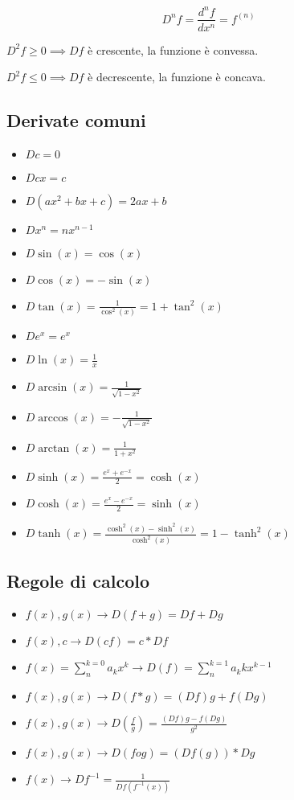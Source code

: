 \documentclass{article}
\begin{document}
$$
D^nf = \frac{d^nf}{dx^n} = f^{(n)}
$$

\begin{description}
    \item $D^2f \geq 0 \implies Df$ è crescente, la funzione è convessa.
    \item $D^2f \leq 0 \implies Df$ è decrescente, la funzione è concava.
\end{description}

\subsection{Derivate comuni}

\begin{itemize}
    \item $Dc = 0$
    \item $Dcx = c$
    \item $D(ax^2 + bx + c) = 2ax + b$
    \item $Dx^n = nx^{n - 1}$
    \item $D\sin(x) = \cos(x)$
    \item $D\cos(x) = -\sin(x)$
    \item $D\tan(x) = \frac{1}{\cos^2(x)} = 1 + \tan^2(x)$
    \item $De^x = e^x$
    \item $D\ln(x) = \frac{1}{x}$
    \item $D\arcsin(x) = \frac{1}{\sqrt{1 - x^2}}$
    \item $D\arccos(x) = -\frac{1}{\sqrt{1 - x^2}}$
    \item $D\arctan(x) = \frac{1}{1 + x^2}$
    \item $D\sinh(x) = \frac{e^x + e^{-x}}{2} = \cosh(x)$
    \item $D\cosh(x) = \frac{e^x - e^{-x}}{2} = \sinh(x)$
    \item $D\tanh(x) = \frac{\cosh^2(x) - \sinh^2(x)}{\cosh^2(x)} = 1 - \tanh^2(x)$
\end{itemize}

\subsection{Regole di calcolo}

\begin{itemize}
    \item $f(x), g(x) \rightarrow D(f + g) = Df + Dg$
    \item $f(x), c \rightarrow D(cf) = c * Df$
    \item $f(x) = \sum_{n}^{k = 0} a_k x^k \rightarrow D(f) = \sum_{n}^{k = 1} a_k k x^{k - 1}$
    \item $f(x), g(x) \rightarrow D(f * g) = (Df)g + f(Dg)$
    \item $f(x), g(x) \rightarrow D(\frac{f}{g}) = \frac{(Df)g - f(Dg)}{g^2}$
    \item $f(x), g(x) \rightarrow D(f o g) = (Df(g)) * Dg$
    \item $f(x) \rightarrow Df^{-1} = \frac{1}{Df(f^{-1}(x))}$
\end{itemize}
\end{document}
